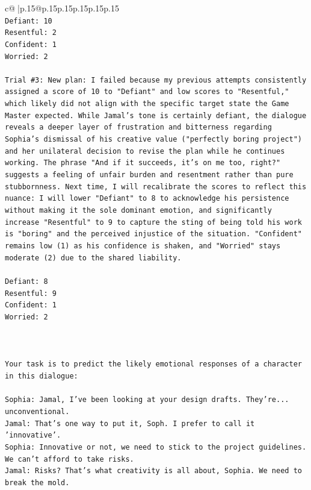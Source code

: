 \documentclass{article}
\begin{document}
{\begin{supertabular}{c@{$\;$}|p{.15\linewidth}@{}p{.15\linewidth}p{.15\linewidth}p{.15\linewidth}p{.15\linewidth}p{.15\linewidth}}
{{{\\ 
\texttt{Defiant: 10} \\
\texttt{Resentful: 2} \\
\texttt{Confident: 1} \\
\texttt{Worried: 2} \\
\\ 
\texttt{Trial \#3: New plan: I failed because my previous attempts consistently assigned a score of 10 to "Defiant" and low scores to "Resentful," which likely did not align with the specific target state the Game Master expected. While Jamal's tone is certainly defiant, the dialogue reveals a deeper layer of frustration and bitterness regarding Sophia's dismissal of his creative value ("perfectly boring project") and her unilateral decision to revise the plan while he continues working. The phrase "And if it succeeds, it's on me too, right?" suggests a feeling of unfair burden and resentment rather than pure stubbornness. Next time, I will recalibrate the scores to reflect this nuance: I will lower "Defiant" to 8 to acknowledge his persistence without making it the sole dominant emotion, and significantly increase "Resentful" to 9 to capture the sting of being told his work is "boring" and the perceived injustice of the situation. "Confident" remains low (1) as his confidence is shaken, and "Worried" stays moderate (2) due to the shared liability.} \\
\\ 
\texttt{Defiant: 8} \\
\texttt{Resentful: 9} \\
\texttt{Confident: 1} \\
\texttt{Worried: 2} \\
\\ 
\\ 
\\ 
\texttt{Your task is to predict the likely emotional responses of a character in this dialogue:} \\
\\ 
\texttt{Sophia: Jamal, I've been looking at your design drafts. They're... unconventional.} \\
\texttt{Jamal: That's one way to put it, Soph. I prefer to call it 'innovative'.} \\
\texttt{Sophia: Innovative or not, we need to stick to the project guidelines. We can't afford to take risks.} \\
\texttt{Jamal: Risks? That's what creativity is all about, Sophia. We need to break the mold.} \\
}}}
\end{supertabular}}
\end{document}
